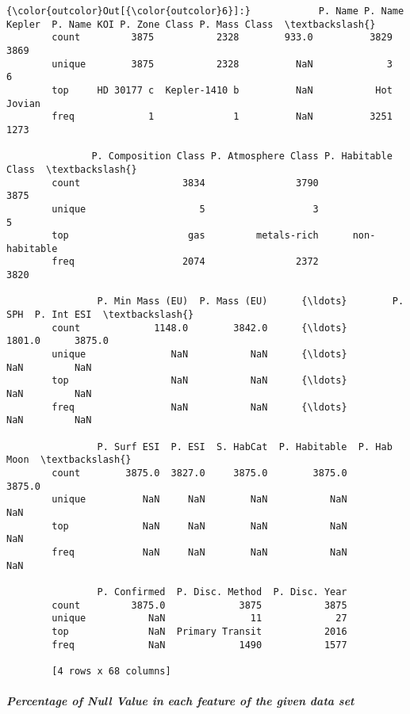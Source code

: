 \documentclass[11pt]{article}
\begin{document}
\begin{Verbatim}[commandchars=\\\{\}]
{\color{outcolor}Out[{\color{outcolor}6}]:}            P. Name P. Name Kepler  P. Name KOI P. Zone Class P. Mass Class  \textbackslash{}
        count         3875           2328        933.0          3829          3869   
        unique        3875           2328          NaN             3             6   
        top     HD 30177 c  Kepler-1410 b          NaN           Hot        Jovian   
        freq             1              1          NaN          3251          1273   
        
               P. Composition Class P. Atmosphere Class P. Habitable Class  \textbackslash{}
        count                  3834                3790               3875   
        unique                    5                   3                  5   
        top                     gas         metals-rich      non-habitable   
        freq                   2074                2372               3820   
        
                P. Min Mass (EU)  P. Mass (EU)      {\ldots}        P. SPH  P. Int ESI  \textbackslash{}
        count             1148.0        3842.0      {\ldots}        1801.0      3875.0   
        unique               NaN           NaN      {\ldots}           NaN         NaN   
        top                  NaN           NaN      {\ldots}           NaN         NaN   
        freq                 NaN           NaN      {\ldots}           NaN         NaN   
        
                P. Surf ESI  P. ESI  S. HabCat  P. Habitable  P. Hab Moon  \textbackslash{}
        count        3875.0  3827.0     3875.0        3875.0       3875.0   
        unique          NaN     NaN        NaN           NaN          NaN   
        top             NaN     NaN        NaN           NaN          NaN   
        freq            NaN     NaN        NaN           NaN          NaN   
        
                P. Confirmed  P. Disc. Method  P. Disc. Year  
        count         3875.0             3875           3875  
        unique           NaN               11             27  
        top              NaN  Primary Transit           2016  
        freq             NaN             1490           1577  
        
        [4 rows x 68 columns]
\end{Verbatim}
            
    \subparagraph{Percentage of Null Value in each feature of the given data
set}\label{percentage-of-null-value-in-each-feature-of-the-given-data-set}
\end{document}
